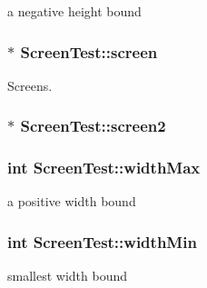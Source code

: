 a negative height bound 

\hypertarget{classScreenTest_af1600b7ee78b7292084cad1902fc0b65}{
\subsubsection[{screen}]{$\ast$ Screen\-Test\-::screen\hspace{0.3cm}{\ttfamily [private]}}}\label{classScreenTest_af1600b7ee78b7292084cad1902fc0b65}


Screens. 

\hypertarget{classScreenTest_a7953fa476ae723c712ca44ea5336dd8b}{
\subsubsection[{screen2}]{$\ast$ Screen\-Test\-::screen2\hspace{0.3cm}{\ttfamily [private]}}}\label{classScreenTest_a7953fa476ae723c712ca44ea5336dd8b}
\hypertarget{classScreenTest_ad96290caf1612456f32e6ec760184421}{
\subsubsection[{width\-Max}]{\setlength{\rightskip}{0pt plus 5cm}int Screen\-Test\-::width\-Max\hspace{0.3cm}{\ttfamily [private]}}}\label{classScreenTest_ad96290caf1612456f32e6ec760184421}


a positive width bound 

\hypertarget{classScreenTest_a226ac6b531b24a7e858f92ae6ecfc326}{
\subsubsection[{width\-Min}]{\setlength{\rightskip}{0pt plus 5cm}int Screen\-Test\-::width\-Min\hspace{0.3cm}{\ttfamily [private]}}}\label{classScreenTest_a226ac6b531b24a7e858f92ae6ecfc326}


smallest width bound 

